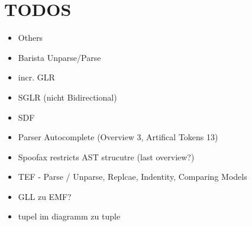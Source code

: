 \chapter{TODOS}
\begin{itemize}
	\item Others
	\item Barista \- Unparse/Parse
	\item incr. GLR
	\item SGLR (nicht Bidirectional)
	\item SDF
	\item Parser Autocomplete (Overview 3, Artifical Tokens 13)
	\item Spoofax restricts AST strucutre (last overview?)
	\item TEF  - Parse / Unparse, Replcae, Indentity, Comparing Models
	\item GLL zu EMF?
	\item tupel im diagramm zu tuple
\end{itemize}